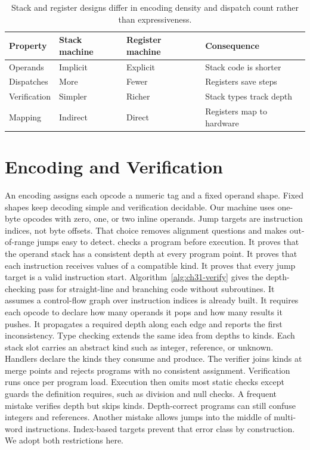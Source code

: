 \begin{table}[htbp]
\centering
\caption{Stack and register designs differ in encoding density and dispatch count rather than expressiveness.}
\label{tab:ch31-stack-register}
\begin{tabular}{llll}
\toprule
Property & Stack machine & Register machine & Consequence \\
\midrule
Operands & Implicit & Explicit & Stack code is shorter \\
Dispatches & More & Fewer & Registers save steps \\
Verification & Simpler & Richer & Stack types track depth \\
Mapping & Indirect & Direct & Registers map to hardware \\
\bottomrule
\end{tabular}
\end{table}

\section{Encoding and Verification}\label{sec:ch31-encoding}

An encoding assigns each opcode a numeric tag and a fixed operand shape.
Fixed shapes keep decoding simple and verification decidable.
Our machine uses one-byte opcodes with zero, one, or two inline operands.
Jump targets are instruction indices, not byte offsets.
That choice removes alignment questions and makes out-of-range jumps easy to detect.
 checks a program before execution.
It proves that the operand stack has a consistent depth at every program point.
It proves that each instruction receives values of a compatible kind.
It proves that every jump target is a valid instruction start.
Algorithm~\ref{alg:ch31-verify} gives the depth-checking pass for straight-line and branching code without subroutines.
It assumes a control-flow graph over instruction indices is already built.
It requires each opcode to declare how many operands it pops and how many results it pushes.
It propagates a required depth along each edge and reports the first inconsistency.
Type checking extends the same idea from depths to kinds.
Each stack slot carries an abstract kind such as integer, reference, or unknown.
Handlers declare the kinds they consume and produce.
The verifier joins kinds at merge points and rejects programs with no consistent assignment.
Verification runs once per program load.
Execution then omits most static checks except guards the definition requires, such as division and null checks.
A frequent mistake verifies depth but skips kinds.
Depth-correct programs can still confuse integers and references.
Another mistake allows jumps into the middle of multi-word instructions.
Index-based targets prevent that error class by construction.
We adopt both restrictions here.

